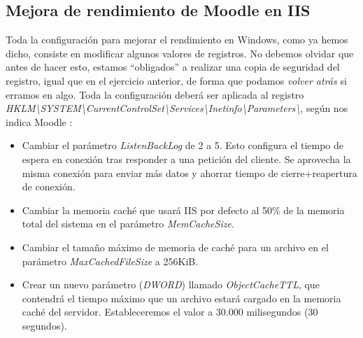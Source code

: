 	\subsection{Mejora de rendimiento de Moodle en IIS}
	Toda la configuración para mejorar el rendimiento en Windows, como ya hemos dicho, consiste en modificar algunos valores de registros. No debemos olvidar 	que antes de hacer esto, estamos ``obligados'' a realizar una copia de seguridad del registro, igual que en el ejercicio anterior, de forma que podamos 			\emph{volver atrás} si erramos en algo. Toda la configuración deberá ser aplicada al registro \emph{HKLM\textbackslash SYSTEM\textbackslash 					CurrentControlSet\textbackslash Services\textbackslash Inetinfo\textbackslash Parameters\textbackslash}, según nos indica Moodle \cite{moodle-iis}:
	\begin{itemize}
		\item Cambiar el parámetro \emph{ListenBackLog} de 2 a 5. Esto configura el tiempo de espera en conexión tras responder a una petición del cliente. Se aprovecha la misma conexión para enviar más datos y ahorrar tiempo de cierre+reapertura de conexión.
		\item Cambiar la memoria caché que usará IIS por defecto al 50\% de la memoria total del sistema en el parámetro \emph{MemCacheSize}.
		\item Cambiar el tamaño máximo de memoria de caché para un archivo en el parámetro \emph{MaxCachedFileSize} a 256KiB.
		\item Crear un nuevo parámetro (\emph{DWORD}) llamado \emph{ObjectCacheTTL}, que contendrá el tiempo máximo que un archivo estará cargado en la memoria caché del servidor. Estableceremos el valor a 30.000 milisegundos (30 segundos).
	\end{itemize}

